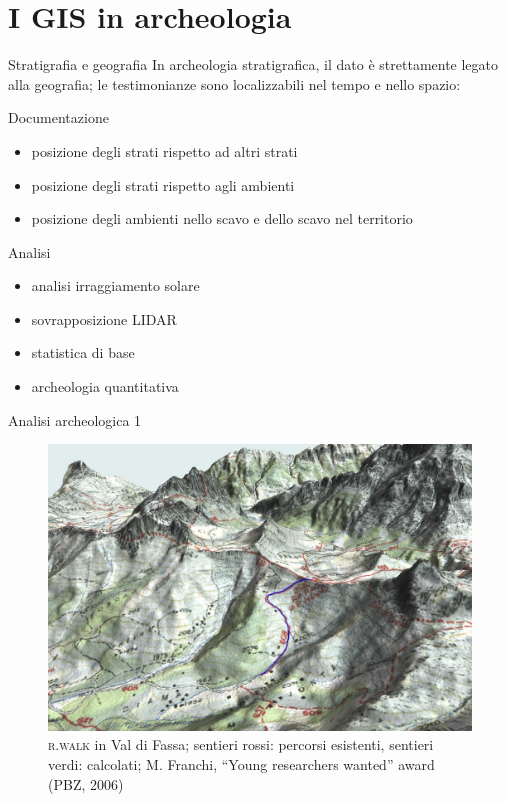 \documentclass{beamer}
\begin{document}
	\section{I GIS in archeologia}
		\begin{frame}{Stratigrafia e geografia}
			In archeologia stratigrafica, il dato è strettamente legato alla geografia; le testimonianze sono localizzabili nel tempo e nello spazio:
			\begin{multicols}{2}[][]
				Documentazione
				\begin{itemize}
					\item posizione degli strati rispetto ad altri strati
					\item posizione degli strati rispetto agli ambienti
					\item posizione degli ambienti nello scavo e dello scavo nel territorio
				\end{itemize}
				\columnbreak
				Analisi
				\begin{itemize}
					\item analisi irraggiamento solare
					\item sovrapposizione LIDAR
					\item statistica di base
					\item archeologia quantitativa
				\end{itemize}
			\end{multicols}
		\end{frame}

		\begin{frame}{Analisi archeologica 1}
			\begin{figure}[]
				\begin{center}
					\includegraphics[width=1\linewidth]{rwalk}
				\end{center}
				\caption{\textsc{r.walk} in Val di Fassa; sentieri rossi: percorsi esistenti, sentieri verdi: calcolati; M. Franchi, “Young researchers wanted” award (PBZ, 2006)}
				\label{fig:rwalk}
			\end{figure}
		\end{frame}
\end{document}
